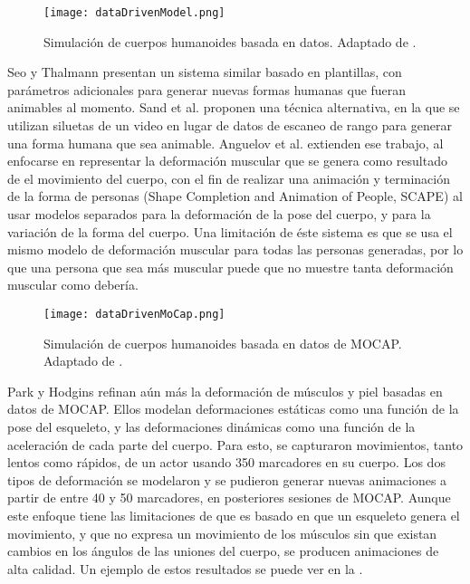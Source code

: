 \begin{figure}
	\centering
		\texttt{[image: dataDrivenModel.png]}
	\caption[Simulación de cuerpos humanoides basada en datos.]{Simulación de cuerpos humanoides basada en datos. Adaptado de \citep{allen2003space}.}
		\label{fig:dataDrivenModel}
\end{figure}

Seo y Thalmann \citep{seo2003automatic} presentan un sistema similar basado en plantillas, con parámetros adicionales para generar nuevas formas humanas que fueran animables al momento. Sand et al. \citep{sand2003continuous} proponen una técnica alternativa, en la que se utilizan siluetas de un video en lugar de datos de escaneo de rango para generar una forma humana que sea animable. Anguelov et al. \citep{anguelov2005scape} extienden ese trabajo, al enfocarse en representar la deformación muscular que se genera como resultado de el movimiento del cuerpo, con el fin de realizar una animación y terminación de la forma de personas (Shape Completion and Animation of People, SCAPE) al usar modelos separados para la deformación de la pose del cuerpo, y para la variación de la forma del cuerpo. Una limitación de éste sistema es que se usa el mismo modelo de deformación muscular para todas las personas generadas, por lo que una persona que sea más muscular puede que no muestre tanta deformación muscular como debería.

\begin{figure}
	\centering
		\texttt{[image: dataDrivenMoCap.png]}
	\caption[Simulación de cuerpos humanoides basada en datos de MOCAP.]{Simulación de cuerpos humanoides basada en datos de MOCAP. Adaptado de \citep{park2008data}.}
		\label{fig:dataDrivenMoCap}
\end{figure}

Park y Hodgins \citep{park2006capturing, park2008data} refinan aún más la deformación de músculos y piel basadas en datos de MOCAP. Ellos modelan deformaciones estáticas como una función de la pose del esqueleto, y las deformaciones dinámicas como una función de la aceleración de cada parte del cuerpo. Para esto, se capturaron movimientos, tanto lentos como rápidos, de un actor usando 350 marcadores en su cuerpo. Los dos tipos de deformación se modelaron y se pudieron generar nuevas animaciones a partir de entre 40 y 50 marcadores, en posteriores sesiones de MOCAP. Aunque este enfoque tiene las limitaciones de que es basado en que un esqueleto genera el movimiento, y que no expresa un movimiento de los músculos sin que existan cambios en los ángulos de las uniones del cuerpo, se producen animaciones de alta calidad. Un ejemplo de estos resultados se puede ver en la .

